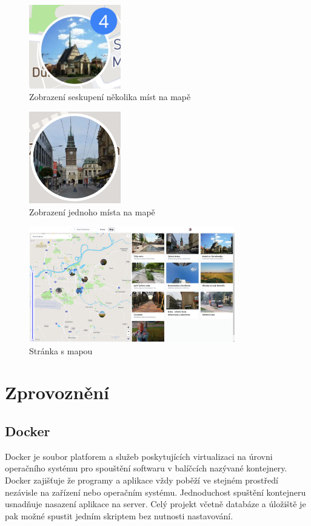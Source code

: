 \documentclass[12pt, a4paper,
 twoside,        %
 openright
]{report}
\begin{document}
\begin{figure}[h]
	\centering
	\includegraphics[width=4cm]{images/places_cluster.png}
	\caption{Zobrazení seskupení několika míst na mapě}
\end{figure}
\begin{figure}[h]
	\centering
	\includegraphics[width=4cm]{images/place.png}
	\caption{Zobrazení jednoho místa na mapě}
\end{figure}

\begin{figure}[h]
	\centering
	\includegraphics[width=0.8\textwidth]{images/map_page.png}
	\caption{Stránka s mapou}
\end{figure}

\chapter{Zprovoznění}
\section{Docker}
Docker je soubor platforem a služeb poskytujících virtualizaci na úrovni operačního systému pro spouštění softwaru v balíčcích nazývané kontejnery. Docker zajišťuje že programy a aplikace vždy poběží ve stejném prostředí nezávisle na zařízení nebo operačním systému. Jednoduchost spuštění kontejneru usnadňuje nasazení aplikace na server. Celý projekt včetně databáze a úložiště je pak možné spustit jedním skriptem bez nutnosti nastavování.
\end{document}
